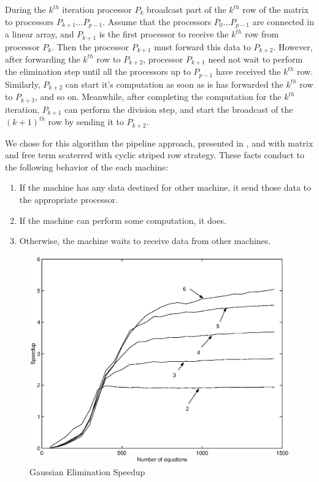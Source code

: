 \documentclass[times,10pt,twocolumn]{article}
\begin{document}
During the $k^{th}$ iteration processor $P_{k}$ broadcast part of
the $k^{th}$ row of the matrix to processors $P_{k+1}\ldots
P_{p-1}$. Assume that the processors $P_0\ldots P_{p-1}$ are
connected in a linear array, and $P_{k+1}$ is the first processor
to receive the $k^{th}$ row from processor $P_{k}$. Then the
processor $P_{k+1}$ must forward this data to $P_{k+2}$. However,
after forwarding the $k^{th}$ row to $P_{k+2}$, processor
$P_{k+1}$ need not wait to perform the elimination step until all
the processors up to $P_{p-1}$ have received the $k^{th}$ row.
Similarly, $P_{k+2}$ can start it's computation as soon as is has
forwarded the $k^{th}$ row to $P_{k+3}$, and so on. Meanwhile,
after completing the computation for the $k^{th}$ iteration,
$P_{k+1}$ can perform the division step, and start the broadcast
of the $(k+1)^{th}$ row by sending it to $P_{k+2}$.

We chose for this algorithm the pipeline approach, presented in
\cite{kumar}, and with matrix and free term scaterred with cyclic
striped row strategy. These facts conduct to the following
behavior of the each machine:
\begin{enumerate}
\item If the machine has any data destined for other machine, it
send those data to the appropriate processor.
\item If the machine can perform some computation, it does.
\item Otherwise, the machine waits to receive data from other
machines.
\end{enumerate}

\begin{figure}[h]
   \includegraphics[scale=0.44]{ge-mpich2-bw.eps}
   \caption{Gaussian Elimination Speedup}
\end{figure}
\end{document}

